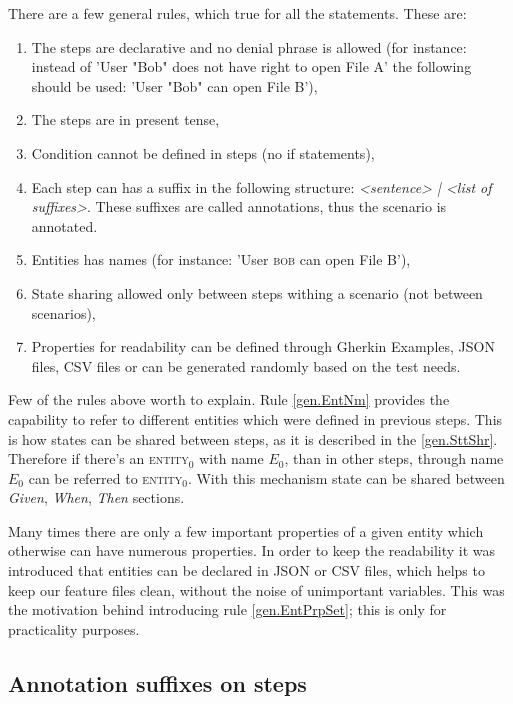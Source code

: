 \documentclass[conference]{IEEEtran}
\begin{document}
There are a few general rules, which true for all the statements. These are:
\begin{enumerate}[label=r.\arabic*]
    \item The steps are declarative and no denial phrase is allowed (for instance: instead of 'User "Bob" does not have right to open File A' the following should be used: 'User "Bob" can open File B'),
    \item The steps are in present tense,
    \item Condition cannot be defined in steps (no if statements),
    \item \label{gen.Annttn} Each step can has a suffix in the following structure: \textit{<sentence> | <list of suffixes>}. These suffixes are called annotations, thus the scenario is annotated.
    \item \label{gen.EntNm} Entities has names (for instance: 'User \textsc{bob} can open File \textsc{B}'),
    \item \label{gen.SttShr}State sharing allowed only between steps withing a scenario (not between scenarios),
    \item \label{gen.EntPrpSet}Properties for readability can be defined through Gherkin Examples, JSON files, CSV files or can be generated randomly based on the test needs.
\end{enumerate}
Few of the rules above worth to explain. Rule \ref{gen.EntNm} provides the capability to refer to different entities which were defined in previous steps. This is how states can be shared between steps, as it is described in the \ref{gen.SttShr}. Therefore if there's an \textsc{entity\(_{0} \)} with name \textit{\(E_{0}\)}, than in other steps, through name \textit{\(E_{0}\)} can be referred to \textsc{entity\(_{0} \)}. With this mechanism state can be shared between \textit{Given}, \textit{When}, \textit{Then} sections.

Many times there are only a few important properties of a given entity which otherwise can have numerous properties. In order to keep the readability it was introduced that entities can be declared in JSON or CSV files, which helps to keep our feature files clean, without the noise of unimportant variables. This was the motivation behind introducing rule \ref{gen.EntPrpSet}; this is only for practicality purposes.

\subsection{Annotation suffixes on steps}
\end{document}
